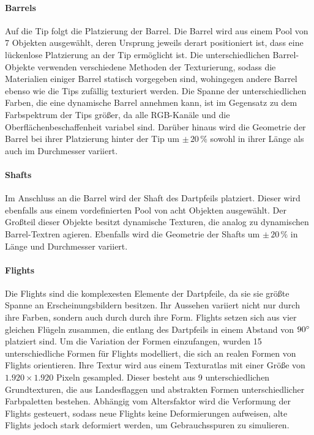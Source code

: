 \paragraph{Barrels}

Auf die Tip folgt die Platzierung der Barrel. Die Barrel wird aus einem Pool von 7 Objekten ausgewählt, deren Ursprung jeweils derart positioniert ist, dass eine lückenlose Platzierung an der Tip ermöglicht ist. Die unterschiedlichen Barrel-Objekte verwenden verschiedene Methoden der Texturierung, sodass die Materialien einiger Barrel statisch vorgegeben sind, wohingegen andere Barrel ebenso wie die Tips zufällig texturiert werden. Die Spanne der unterschiedlichen Farben, die eine dynamische Barrel annehmen kann, ist im Gegensatz zu dem Farbspektrum der Tips größer, da alle RGB-Kanäle und die Oberflächenbeschaffenheit variabel sind. Darüber hinaus wird die Geometrie der Barrel bei ihrer Platzierung hinter der Tip um $\pm\,20\,\%$ sowohl in ihrer Länge als auch im Durchmesser variiert.

\paragraph{Shafts}

Im Anschluss an die Barrel wird der Shaft des Dartpfeils platziert. Dieser wird ebenfalls aus einem vordefinierten Pool von acht Objekten ausgewählt. Der Großteil dieser Objekte besitzt dynamische Texturen, die analog zu dynamischen Barrel-Textren agieren. Ebenfalls wird die Geometrie der Shafts um $\pm\,20\,\%$ in Länge und Durchmesser variiert.

\paragraph{Flights}

Die Flights sind die komplexesten Elemente der Dartpfeile, da sie sie größte Spanne an Erscheinungsbildern besitzen. Ihr Aussehen variiert nicht nur durch ihre Farben, sondern auch durch durch ihre Form. Flights setzen sich aus vier gleichen Flügeln zusammen, die entlang des Dartpfeils in einem Abstand von $90^{\circ}$ platziert sind. Um die Variation der Formen einzufangen, wurden 15 unterschiedliche Formen für Flights modelliert, die sich an realen Formen von Flights orientieren. Ihre Textur wird aus einem Texturatlas mit einer Größe von $1.920 \times 1.920$ Pixeln gesampled. Dieser besteht aus 9 unterschiedlichen Grundtexturen, die aus Landesflaggen und abstrakten Formen unterschiedlicher Farbpaletten bestehen. Abhängig vom Altersfaktor wird die Verformung der Flights gesteuert, sodass neue Flights keine Deformierungen aufweisen, alte Flights jedoch stark deformiert werden, um Gebrauchsspuren zu simulieren.

